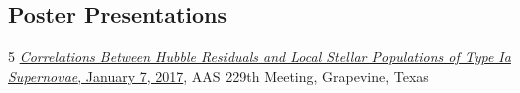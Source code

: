 \documentclass[margin]{res}
\begin{document}
\begin{resume}





\section{Poster Presentations}




\hangindent=15pt {\footnotesize \textcolor{light-gray}{5}} \href{https://ui.adsabs.harvard.edu/#abs/2017AAS...22943402R/abstract}{{\sl Correlations Between Hubble Residuals and Local Stellar Populations of Type Ia Supernovae}, January 7, 2017}, AAS 229th Meeting, Grapevine, Texas
\vspace{-12pt}


\end{resume}
\end{document}
